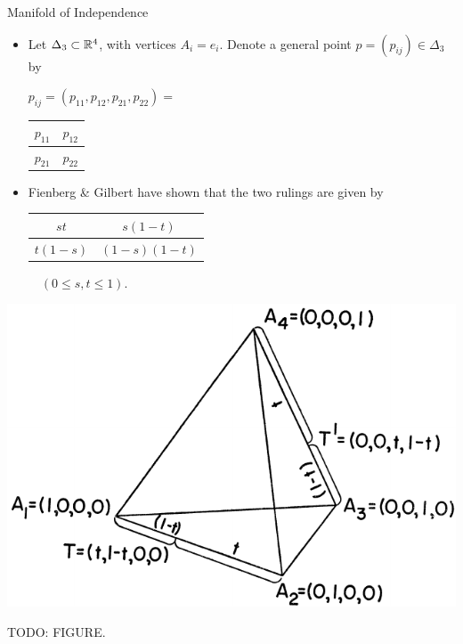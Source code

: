 \begin{frame}{Manifold of Independence}

    \begin{itemize}
        \item Let $\Delta_{3} \subset \mathbb{R}^{4}$, with vertices $A_{i} = e_{i}$. Denote a general point $p = (p_{ij}) \in \Delta_{3}$ by
        
        \begin{center}
        \begin{table}[]
        $p_{ij} = (p_{11}, p_{12}, p_{21}, p_{22}) =$ 
        \begin{tabular}{|l|l|}
        \hline
        $p_{11}$ & $p_{12}$ \\ \hline
        $p_{21}$ & $p_{22}$ \\ \hline
        \end{tabular}
        \end{table}
        \end{center}

    \item Fienberg & Gilbert have shown that the two rulings are given by
    \begin{center}
    \begin{table}[]
    \begin{tabular}{|c|c|}
    \hline
    $st$ & $s(1-t)$ \\ \hline
    $t(1-s)$ & $(1-s)(1-t)$ \\ \hline
    \end{tabular}
    $\quad (0 \leq s,t \leq 1).$
    \end{table}
    \end{center}
    
    \end{itemize}

    \begin{center}
        \includegraphics[height=0.25\textwidth]{resources/tetrahedron.pdf}
    \end{center}
    
\end{frame}

\begin{frame}
    TODO: FIGURE.
\end{frame}